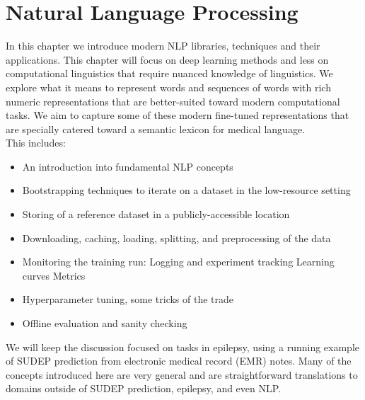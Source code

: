 
\chapter{Natural Language Processing}

In this chapter we introduce modern NLP libraries, techniques and their applications.
This chapter will focus on deep learning methods and less on computational linguistics that require nuanced knowledge of linguistics.
We explore what it means to represent words and sequences of words with rich numeric representations that are better-suited toward modern computational tasks.
We aim to capture some of these modern fine-tuned representations that are specially catered toward a semantic lexicon for medical language.
\\

\noindent This includes:
\begin{itemize}
\item An introduction into fundamental NLP concepts
\item Bootstrapping techniques to iterate on a dataset in the low-resource setting
\item Storing of a reference dataset in a publicly-accessible location
\item Downloading, caching, loading, splitting, and preprocessing of the data
\item Monitoring the training run:
  \subitem Logging and experiment tracking
  \subitem Learning curves
  \subitem Metrics
\item Hyperparameter tuning, some tricks of the trade
\item Offline evaluation and sanity checking
\end{itemize}
We will keep the discussion focused on tasks in epilepsy, using a running example of SUDEP prediction from electronic medical record (EMR) notes.
Many of the concepts introduced here are very general and are straightforward translations to domains outside of SUDEP prediction, epilepsy, and even NLP.







